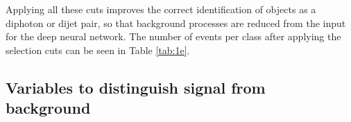 
Applying all these cuts improves the correct identification of objects as a diphoton or dijet pair, so that background processes are reduced from the input for the deep neural network.
The number of events per class after applying the selection cuts can be seen in Table \ref{tab:1e}.



\subsection{Variables to distinguish signal from background}
\label{sec:trainvar}


